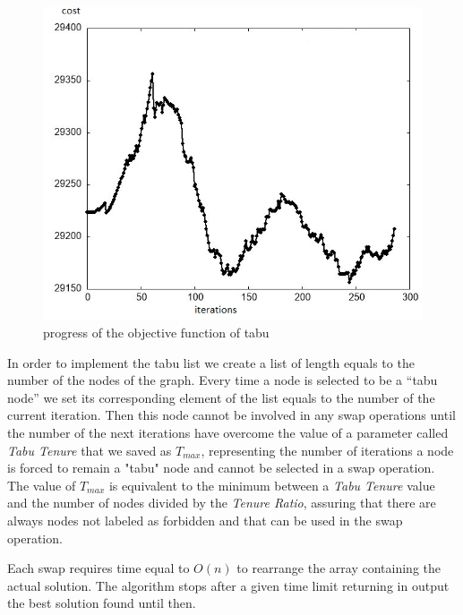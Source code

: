 \begin{figure}[!h]
    \centering
    \includegraphics[scale=0.8]{images/tabuperf.png}
    \caption{progress of the objective function of tabu}
    \label{fig:TABUPERF}
\end{figure}

In order to implement the tabu list we create a list of length equals to the number of the nodes of the graph. Every time a node is selected to be a “tabu node” we set its corresponding element of the list equals to the number of the current iteration. Then this node cannot be involved in any swap operations until the number of the next iterations have overcome the value of a parameter called \textit{Tabu Tenure} that we saved as $T_{max}$, representing the number of iterations a node is forced to remain a "tabu" node and cannot be selected in a swap operation.
The value of $T_{max}$ is equivalent to the minimum between a \textit{Tabu Tenure} value and the number of nodes divided by the \textit{Tenure Ratio}, assuring that there are always nodes not labeled as forbidden and that can be used in the swap operation.

Each swap requires time equal to $O(n)$ to rearrange the array containing the actual solution.
The algorithm stops after a given time limit returning in output the best solution found until then.

